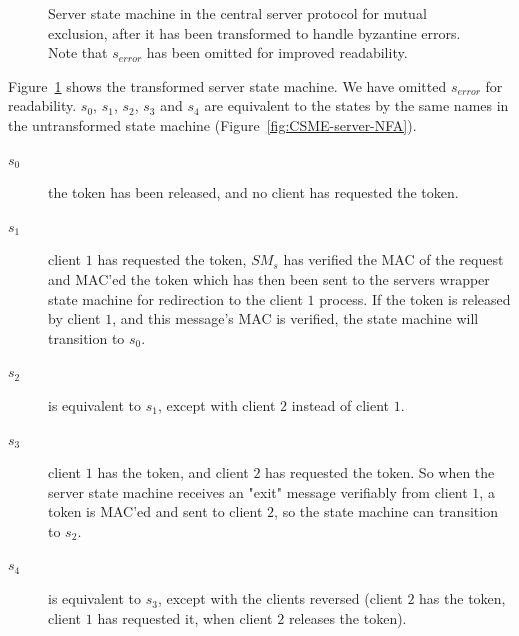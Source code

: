 \documentclass{article}
\begin{document}
		\begin{figure}[ht]
			\center
			\caption{Server state machine in the central server protocol for mutual exclusion, after it has been transformed to handle byzantine errors. Note that $s_{error}$ has been omitted for improved readability.}
			\label{fig:CSME-server-NFA-transformed}
		\end{figure}
		\FloatBarrier

		Figure~\ref{fig:CSME-server-NFA-transformed} shows the transformed server state machine.
		We have omitted $s_{error}$ for readability.
		$s_0$, $s_1$, $s_2$, $s_3$ and $s_4$ are equivalent to the states by the same names in the untransformed state machine (Figure~\ref{fig:CSME-server-NFA}).

		\begin{description}
			\item[$s_0$] the token has been released, and no client has requested the token.
			\item[$s_1$] client $1$ has requested the token, $SM_s$ has verified the MAC of the request and MAC'ed the token which has then been sent to the servers wrapper state machine for redirection to the client $1$ process.
			If the token is released by client $1$, and this message's MAC is verified, the state machine will transition to $s_0$.
			\item[$s_2$] is equivalent to $s_1$, except with client $2$ instead of client $1$.
			\item[$s_3$] client $1$ has the token, and client $2$ has requested the token.
			So when the server state machine receives an "exit" message verifiably from client $1$, a token is MAC'ed and sent to client $2$, so the state machine can transition to $s_2$.
			\item[$s_4$] is equivalent to $s_3$, except with the clients reversed (client $2$ has the token, client $1$ has requested it, when client $2$ releases the token).
		\end{description}
\end{document}
